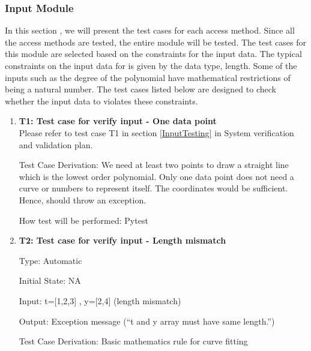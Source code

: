 \documentclass[12pt, titlepage]{article}
\begin{document}
\subsubsection {Input Module}

In this section , we will present the test cases for each access method. Since 
all the access methods are tested, the entire module will be tested. The test 
cases for this module are selected based on the constraints for the input data. 
The typical constraints on the input data for \famname{} is given by the data 
type, length. Some of the inputs such as the degree of the polynomial have 
mathematical restrictions of being a natural number. The test cases listed 
below are designed to check whether the input data to \famname{} violates these 
constraints.  


\begin{enumerate}

\item{\textbf{T1: Test case for verify input - One data point}}\\
Please refer to test case T1 in section \ref{InputTesting} in System 
verification and validation plan.
\begin{comment}
Type:  Automatic

Initial State: NA

Input: t=[1] , y=[2] (length 1)

Output: Error message (``Please enter at least \wss{proof read}\ms{Corrected} 2 
points'')

How test will be performed: Pytest
\end{comment}					

Test Case Derivation: We need at least two points to draw a straight line which 
is the lowest order polynomial. Only one data point does not need a curve or 
numbers to represent itself. The coordinates would be sufficient. Hence, 
\famname{} should throw an exception.

How test will be performed: Pytest
					
\item{\textbf{T2: Test case for verify input - Length mismatch}}

Type: Automatic
					
Initial State: NA 
					
Input: t=[1,2,3] , y=[2,4] (length mismatch)
					
Output: Exception message (``t and y array must have same length.'')

Test Case Derivation: Basic mathematics rule for curve fitting 


\end{enumerate}
\end{document}
